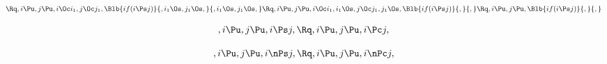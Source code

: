 \begin{math}
\Rq, i \Pu, j \Pu, i \Oc i_1, j \Oc j_1,\Blb{if(i \Ps j)}{, i_1 \Os, j_1 \Os,}{, i_1 \Os, j_1 \Os,}\\\\\\\\
\Rq, i \Pu, j \Pu, i \Oc i_1, i_1 \Os, j \Oc j_1, j_1 \Os, \Blb{if(i \Ps j)}{,}{,}\\\\\\\\
\Rq, i \Pu, j \Pu, \Blb{if(i \Ps j)}{,}{,}
\end{math}
\bigskip
\bigskip
\bigskip
\bigskip


\bigskip
\bigskip
\[,i \Pu, j \Pu, i \Ps j, \Rq ,i \Pu, j \Pu, i \Pc j,\]

\[,i \Pu, j \Pu, i \nPs j, \Rq ,i \Pu, j \Pu, i \nPc j,\]



\bigskip
\bigskip
\bigskip
\bigskip
